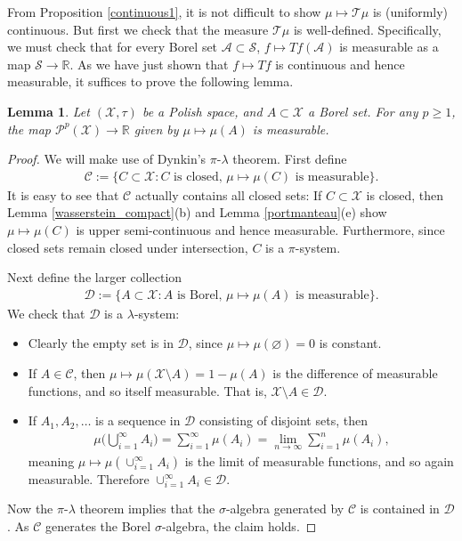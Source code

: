 \documentclass[11pt,reqno]{amsart}
\numberwithin{equation}{section}
\newtheorem{lemma}[thm]{Lemma}
\theoremstyle{definition}
\begin{document}
From Proposition \ref{continuous1}, it is not difficult to show $\mu \mapsto {\mathcal{T}}\mu$ is (uniformly) continuous.
But first we check that the measure ${\mathcal{T}}\mu$ is well-defined.
Specifically, we must check that for every Borel set ${\mathcal{A}}\subset {\mathcal{S}}$, $f \mapsto Tf({\mathcal{A}})$ is measurable as a map ${\mathcal{S}} \to {\mathbb{R}}$.
As we have just shown that $f \mapsto Tf$ is continuous and hence measurable, it suffices to prove the following lemma.

\begin{lemma} \label{evaluation_meas}
Let $({\mathcal{X}},\tau)$ be a Polish space, and $A \subset {\mathcal{X}}$ a Borel set.
For any $p \geq 1$, the map ${\mathcal{P}}^p({\mathcal{X}}) \to {\mathbb{R}}$ given by $\mu \mapsto \mu(A)$ is measurable.
\end{lemma}

\begin{proof}
We will make use of Dynkin's $\pi$-$\lambda$ theorem.
First define
{\begin{align*} {
{\mathcal{C}} := \{C \subset {\mathcal{X}} : \text{$C$ is closed, $\mu \mapsto \mu(C)$ is measurable}\}.
} \end{align*}}
It is easy to see that ${\mathcal{C}}$ actually contains all closed sets: If $C \subset {\mathcal{X}}$ is closed, then Lemma \ref{wasserstein_compact}(b) and Lemma \ref{portmanteau}(e) show $\mu \mapsto \mu(C)$ is upper semi-continuous and hence measurable.
Furthermore, since closed sets remain closed under intersection, $C$ is a $\pi$-system.

Next define the larger collection
{\begin{align*} {
{\mathcal{D}} := \{A \subset {\mathcal{X}}: \text{$A$ is Borel, $\mu \mapsto \mu(A)$ is measurable}\}.
} \end{align*}}
We check that ${\mathcal{D}}$ is a $\lambda$-system:
\begin{itemize}
\item Clearly the empty set is in ${\mathcal{D}}$, since $\mu \mapsto \mu(\varnothing) = 0$ is constant.
\item If $A \in {\mathcal{C}}$, then $\mu \mapsto \mu({\mathcal{X}} \setminus A) = 1 - \mu(A)$ is the difference of measurable functions, and so itself measurable.
That is, ${\mathcal{X}} \setminus A \in {\mathcal{D}}$.
\item If $A_1,A_2,\dots$ is a sequence in ${\mathcal{D}}$ consisting of disjoint sets, then
{\begin{align*} {
\mu\bigg(\bigcup_{i = 1}^\infty A_i\bigg) = \sum_{i = 1}^\infty \mu(A_i) = \lim_{n \to \infty} \sum_{i = 1}^n \mu(A_i),
} \end{align*}}
meaning $\mu \mapsto \mu(\cup_{i = 1}^\infty A_i)$ is the limit of measurable functions, and so again measurable.
Therefore $\cup_{i = 1}^\infty A_i \in {\mathcal{D}}$.
\end{itemize}
Now the $\pi$-$\lambda$ theorem implies that the $\sigma$-algebra generated by ${\mathcal{C}}$ is contained in ${\mathcal{D}}$.
As ${\mathcal{C}}$ generates the Borel $\sigma$-algebra, the claim holds.
\end{proof}
\end{document}
